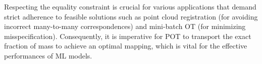 \begin{remark} \label{remark:violation}
Respecting the equality constraint is crucial for various applications that demand strict adherence to feasible solutions such as point cloud registration \citep{qin2022rigid} (for avoiding  incorrect many-to-many correspondences) and mini-batch OT \citep{nguyen2022improving} (for minimizing misspecification). 
Consequently, it is imperative for POT to transport the exact fraction of mass to achieve an optimal mapping, which is vital for the effective performances of ML models.
\end{remark}


